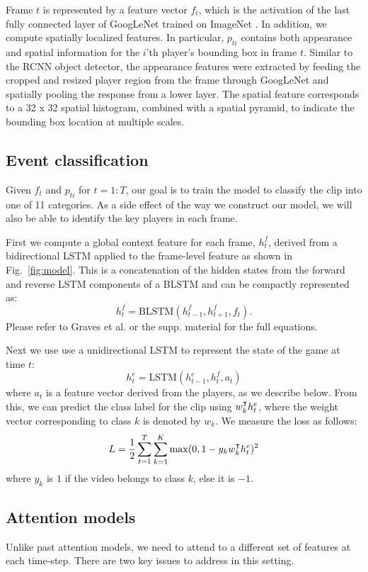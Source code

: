 Frame $t$ is represented by a feature vector $f_t$, which is the activation
of the last fully connected layer of GoogLeNet \cite{} trained on ImageNet
\cite{}.  In addition, we compute spatially localized features.  In particular,
$p_{ti}$ contains both appearance and spatial information for the $i$'th
player's bounding box in frame $t$. Similar to the RCNN object detector\cite{},
the appearance features were extracted by feeding
the cropped and resized player region from the frame through GoogLeNet and
spatially pooling the response from a lower layer. The spatial feature
corresponds to a 32 x 32 spatial histogram, combined with a spatial
pyramid,
to indicate the bounding box location at multiple scales.


\subsection{Event classification}

Given $f_t$ and $p_{ti}$ for $t=1:T$, our goal
is to train the model to classify the clip into one of 11 categories. As a side
effect of the way we construct our model, we will also be able to identify the
key players in each frame.

First we compute a global context feature for each frame, $h_t^f$, derived from
a bidirectional LSTM applied to the frame-level feature as shown in Fig.~\ref{fig:model}.
This is a concatenation of the hidden states from the forward and reverse LSTM
components of a BLSTM and can be compactly represented as:
\[
h_t^f = \mbox{BLSTM}(h_{t-1}^f, h_{t+1}^f, f_t).
\]Please refer to Graves et al. \cite{Graves_2013} or the supp. material
for the full equations.

Next we use use a unidirectional LSTM to represent the state of the
game at time $t$:
\[
h_t^e = \mbox{LSTM}(h_{t-1}^e, h_t^f, a_t)
\]
where $a_t$ is a feature vector derived from the players, as we
describe below.
From this, we can predict the class label for the clip using
$w_k^{\intercal} h_t^e$,
where the weight vector corresponding to
class $k$ is denoted by $w_k$.
 We measure the loss as follows:
\begin{equation}
  L =   \frac{1}{2} \sum_{t=1}^T \sum_{k = 1}^K \max (0, 1 - y_k w_k^{\intercal} h^e_t)^2
\end{equation} 
where $y_k$ is $1$ if the video belongs to class $k$,
else it is $-1$.

\subsection{Attention models}
Unlike past attention models, we need to attend to a different set of
features at each time-step. There are two key issues to address in this
setting.

